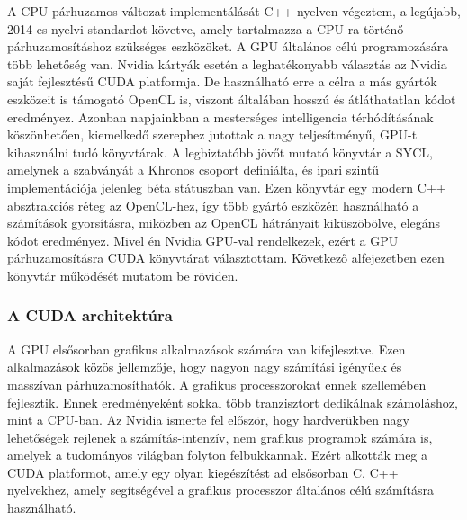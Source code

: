\documentclass[11pt,a4paper]{article}
\numberwithin{equation}{subsection}
\numberwithin{figure}{section}
\begin{document}
A CPU párhuzamos változat implementálását C++ nyelven végeztem, a legújabb, 2014-es nyelvi standardot követve, amely tartalmazza a CPU-ra történő párhuzamosításhoz szükséges eszközöket. A GPU általános célú programozására több lehetőség van. Nvidia kártyák esetén a leghatékonyabb választás az Nvidia saját fejlesztésű CUDA platformja. De használható erre a célra a más gyártók eszközeit is támogató OpenCL is, viszont általában hosszú és átláthatatlan kódot eredményez. Azonban napjainkban a mesterséges intelligencia térhódításának köszönhetően, kiemelkedő szerephez jutottak a nagy teljesítményű, GPU-t kihasználni tudó könyvtárak. A legbiztatóbb jövőt mutató könyvtár a SYCL, amelynek a szabványát a Khronos csoport definiálta, és ipari szintű implementációja jelenleg béta státuszban van. Ezen könyvtár egy modern C++ absztrakciós réteg az OpenCL-hez, így több gyártó eszközén használható a számítások gyorsításra, miközben az OpenCL hátrányait kiküszöbölve, elegáns kódot eredményez. Mivel én Nvidia GPU-val rendelkezek, ezért a GPU párhuzamosításra CUDA könyvtárat választottam. Következő alfejezetben ezen könyvtár működését mutatom be röviden. 

 
\subsubsection{A CUDA architektúra}\label{sec:CUDA}
A GPU elsősorban grafikus alkalmazások számára van kifejlesztve. Ezen alkalmazások közös jellemzője, hogy nagyon nagy számítási igényűek és masszívan párhuzamosíthatók. A grafikus processzorokat ennek szellemében fejlesztik. Ennek eredményeként sokkal több tranzisztort dedikálnak számoláshoz, mint a CPU-ban. Az Nvidia ismerte fel először, hogy hardverükben nagy lehetőségek rejlenek a számítás-intenzív, nem grafikus programok számára is, amelyek a tudományos világban folyton felbukkannak. Ezért alkották meg a CUDA platformot, amely egy olyan kiegészítést ad elsősorban C, C++ nyelvekhez, amely segítségével a grafikus processzor általános célú számításra használható. 
\end{document}
